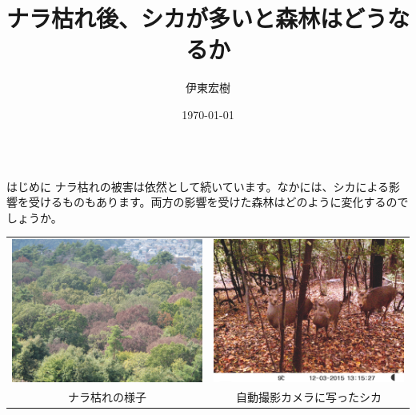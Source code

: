 \documentclass[unicode]{beamer}
\title{ナラ枯れ後、シカが多いと森林はどうなるか}
\author{伊東宏樹}
\institute{森林総合研究所北海道支所}
\date{\today}
\begin{document}
\begin{frame}
\begin{columns}[t]
\begin{column}{.49\linewidth}

\begin{block}{はじめに}
ナラ枯れの被害は依然として続いています。なかには、シカによる影響を受けるものもあります。両方の影響を受けた森林はどのように変化するのでしょうか。

\vspace{2cm}
\centering
\begin{tabular}{cc}
\includegraphics[width=18cm]{photo-2.jpg} &
\includegraphics[width=18cm]{photo-3.jpg} \\
{\small ナラ枯れの様子} &
{\small 自動撮影カメラに写ったシカ}
\end{tabular}



\end{block}
\end{column}
\end{columns}
\end{frame}
\end{document}
